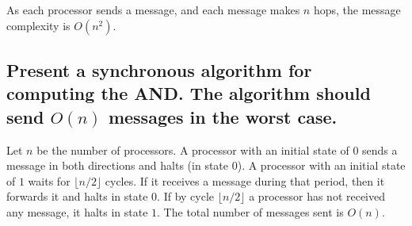 \documentclass[11pt]{article} %
\begin{document}
As each processor sends a message, and each message makes $n$ hops, the message complexity is $O(n^2)$.

\subsection{Present a synchronous algorithm for computing the AND. The algorithm should send $O(n)$ messages in the worst case.}

Let $n$ be the number of processors. A processor with an initial state of $0$ sends a message in both directions and halts (in state $0$). A processor with an initial state of $1$ waits for $\lfloor n / 2 \rfloor$ cycles. If it receives a message during that period, then it forwards it and halts in state $0$. If by cycle $\lfloor n / 2 \rfloor$ a processor has not received any message, it halts in state $1$. The total number of messages sent is $O(n)$.
\end{document}
